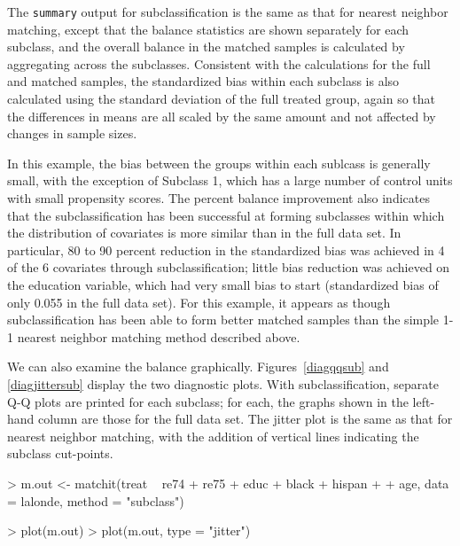 \documentclass[oneside,letterpaper,titlepage]{article}
\begin{document}
\begin{enumerate}
The \texttt{summary} output for subclassification is the same as that
for nearest neighbor matching, except that the balance statistics are
shown separately for each subclass, and the overall balance in the
matched samples is calculated by aggregating across the subclasses.
Consistent with the calculations for the full and matched samples, the
standardized bias within each subclass is also calculated using the
standard deviation of the full treated group, again so that the
differences in means are all scaled by the same amount and not
affected by changes in sample sizes.

In this example, the bias between the groups within each sublcass is
generally small, with the exception of Subclass 1, which has a large
number of control units with small propensity scores.  The percent
balance improvement also indicates that the subclassification has been
successful at forming subclasses within which the distribution of
covariates is more similar than in the full data set.  In particular,
80 to 90 percent reduction in the standardized bias was achieved in 4
of the 6 covariates through subclassification; little bias reduction
was achieved on the education variable, which had very small bias to
start (standardized bias of only 0.055 in the full data set).  For
this example, it appears as though subclassification has been able to
form better matched samples than the simple 1-1 nearest neighbor
matching method described above.

We can also examine the balance graphically.  Figures~\ref{diagqqsub}
and \ref{diagjittersub} display the two diagnostic plots.  With
subclassification, separate Q-Q plots are printed for each subclass;
for each, the graphs shown in the left-hand column are those for the
full data set.  The jitter plot is the same as that for nearest
neighbor matching, with the addition of vertical lines indicating the
subclass cut-points.

\begin{Schunk}
\begin{Sinput}
> m.out <- matchit(treat ~ re74 + re75 + educ + black + hispan + 
+     age, data = lalonde, method = "subclass")
\end{Sinput}
\end{Schunk}
\begin{Schunk}
\begin{Sinput}
> plot(m.out)
> plot(m.out, type = "jitter")
\end{Sinput}
\end{Schunk}


\end{enumerate}
\end{document}

